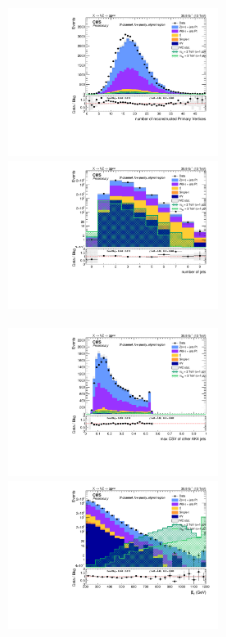 \begin{figure}[!htb]
  \begin{center}  
    \includegraphics[width=0.495\textwidth]{plots/v9_U/XVZnnlpSR/nPV.pdf}
    \includegraphics[width=0.495\textwidth]{plots/v9_U/XVZnnlpSR/nJets.pdf}

    \includegraphics[width=0.495\textwidth]{plots/v9_U/XVZnnlpSR/MaxJetBTag.pdf}
    \includegraphics[width=0.495\textwidth]{plots/v9_U/XVZnnlpSR/MEt_pt.pdf}


\end{center}
\end{figure}
